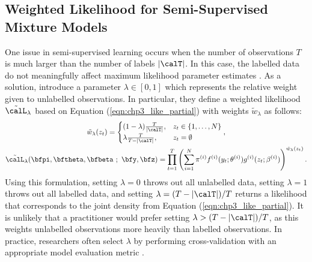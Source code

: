 \subsection{Weighted Likelihood for Semi-Supervised Mixture Models}

\label{sec:chp3_2_3}

One issue in semi-supervised learning occurs when the number of observations $T$ is much larger than the number of labels $|\calT|$. In this case, the labelled data do not meaningfully affect maximum likelihood parameter estimates \citep{Chapelle:2006}. As a solution, \citet{Chapelle:2006} introduce a parameter $\lambda \in [0,1]$ which represents the relative weight given to unlabelled observations. In particular, they define a weighted likelihood $\tilde \calL_\lambda$ based on Equation (\ref{eqn:chp3_like_partial}) with weights $\tilde w_\lambda$ as follows:
%
\begin{gather}
    \tilde w_\lambda(z_t) = \begin{cases}
    (1-\lambda) \frac{T}{|\calT|}, & z_t \in \{1,\ldots,N\} \\ 
    \lambda \frac{T}{T-|\calT|}, & z_t = \emptyset \\
    \end{cases}, \label{eqn:tilde_w_lambda} \\
    \tilde \calL_\lambda (\bfpi,\bftheta,\bfbeta ~;~ \bfy,\bfz) = \prod_{t = 1}^T \left(\sum_{i = 1}^N \pi^{(i)} f^{(i)}(y_t; \theta^{(i)}) g^{(i)}(z_t ; \beta^{(i)}) \right)^{\tilde w_\lambda(z_t)}.
    \label{eqn:chp3_like_partial_lambda} 
\end{gather}
%
Using this formulation, setting $\lambda = 0$ throws out all unlabelled data, setting $\lambda = 1$ throws out all labelled data, and setting $\lambda = (T-|\calT|)/T$ returns a likelihood that corresponds to the joint density from Equation (\ref{eqn:chp3_like_partial}). It is unlikely that a practitioner would prefer setting $\lambda > (T-|\calT|)/T$, as this weights unlabelled observations more heavily than labelled observations. In practice, researchers often select $\lambda$ by performing cross-validation with an appropriate model evaluation metric \citep{Chapelle:2006}. 

